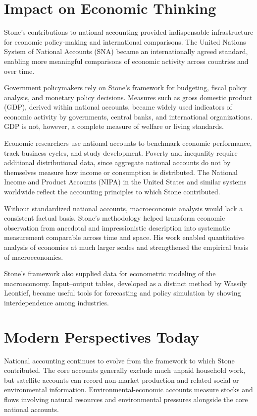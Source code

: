 \section{Impact on Economic Thinking}
Stone's contributions to national accounting provided indispensable
infrastructure for economic policy-making and international comparisons. The
United Nations System of National Accounts (SNA) became an internationally
agreed standard, enabling more meaningful comparisons of economic activity
across countries and over time.

Government policymakers rely on Stone's framework for budgeting, fiscal
policy analysis, and monetary policy decisions. Measures such as gross
domestic product (GDP), derived within national accounts, became widely used
indicators of economic activity by governments, central banks, and
international organizations. GDP is not, however, a complete measure of
welfare or living standards.

Economic researchers use national accounts to benchmark economic performance,
track business cycles, and study development. Poverty and inequality require
additional distributional data, since aggregate national accounts do not by
themselves measure how income or consumption is distributed. The National
Income and Product Accounts (NIPA) in the United States and similar systems
worldwide reflect the accounting principles to which Stone contributed.

Without standardized national accounts, macroeconomic analysis would lack a
consistent factual basis. Stone's methodology helped transform economic
observation from anecdotal and impressionistic description into systematic
measurement comparable across time and space. His work enabled quantitative
analysis of economies at much larger scales and strengthened the empirical
basis of macroeconomics.

Stone's framework also supplied data for econometric modeling of the
macroeconomy. Input--output tables, developed as a distinct method by Wassily
Leontief, became useful tools for forecasting and policy simulation by showing
interdependence among industries.

\section{Modern Perspectives Today}
National accounting continues to evolve from the framework to which Stone
contributed. The core accounts generally exclude much unpaid household work,
but satellite accounts can record non-market production and related social or
environmental information. Environmental-economic accounts measure stocks and
flows involving natural resources and environmental pressures alongside the
core national accounts.

